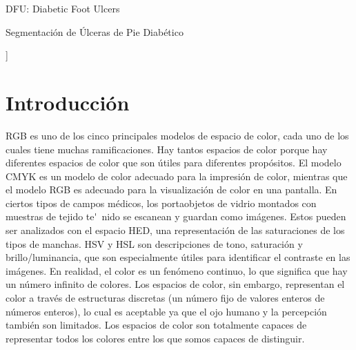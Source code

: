 \documentclass[a4paper,10pt,twocolumn]{article}
\begin{document}
\begin{keywords}
DFU: Diabetic Foot Ulcers

\end{keywords}

\begin{topics}
Segmentaci\'on de \'Ulceras de Pie Diab\'etico
\end{topics}


\vspace{0.8cm}
]



\section{Introducción}\label{sec:intro}


RGB es uno de los cinco principales modelos de espacio de color, cada uno de los cuales 
tiene muchas ramificaciones. Hay tantos espacios de color porque hay diferentes espacios de 
color que son \'utiles para diferentes prop\'ositos. El modelo CMYK es un modelo de color 
adecuado para la impresi\'on de color, mientras que el modelo RGB es adecuado para la 
visualizaci\'on de color en una pantalla. En ciertos tipos de campos m\'edicos, los portaobjetos 
de vidrio montados con muestras de tejido te\'~nido se escanean y guardan como im\'agenes. Estos 
pueden ser analizados con el espacio HED, una representaci\'on de las saturaciones de los tipos 
de manchas. HSV y HSL son descripciones de tono, saturaci\'on y brillo/luminancia, que son 
especialmente \'utiles para identificar el contraste en las im\'agenes. En realidad, el color 
es un fen\'omeno continuo, lo que significa que hay un n\'umero infinito de colores. 
Los espacios de color, sin embargo, representan el color a trav\'es de estructuras discretas 
(un n\'umero fijo de valores enteros de n\'umeros enteros), lo cual es aceptable ya que el ojo 
humano y la percepci\'on tambi\'en son limitados. Los espacios de color son totalmente capaces de 
representar todos los colores entre los que somos capaces de distinguir.
\end{document}
